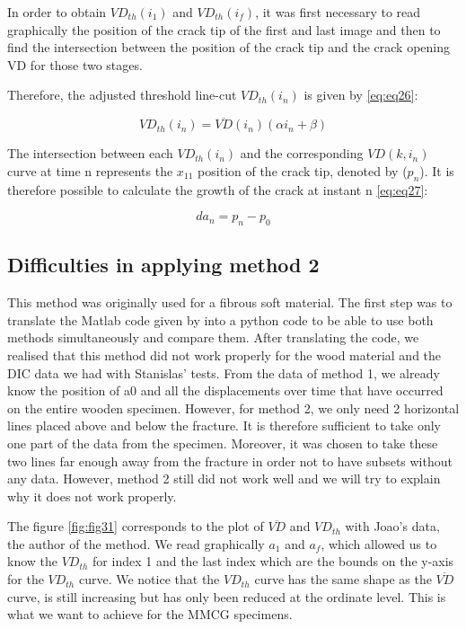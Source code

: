 In order to obtain $VD_{th}(i_1)$ and $VD_{th}(i_f)$, it was first necessary to read graphically the position of the crack tip of the first and last image and then to find the intersection between the position of the crack tip and the crack opening VD for those two stages.

Therefore, the adjusted threshold line-cut $VD_{th}(i_n)$ is given by \ref{eq:eq26}:

\begin{equation}
	VD_{th}(i_n)=\overline{VD}(i_n)(\alpha i_n +\beta)
	\label{eq:eq26}
\end{equation}

The intersection between each $VD_{th}(i_n)$ and the corresponding $VD(k, i_n)$ curve at time n represents the $x_{11}$ position of the crack tip, denoted by ($p_n$).
It is therefore possible to calculate the growth of the crack at instant n \ref{eq:eq27}:

\begin{equation}
	da_n=p_n-p_0
	\label{eq:eq27}
\end{equation}

\subsection{Difficulties in applying method 2}

This method was originally used for a fibrous soft material. The first step was to translate the Matlab code given by \cite{FilhoJ2022} into a python code to be able to use both methods simultaneously and compare them.
After translating the code, we realised that this method did not work properly for the wood material and the DIC data we had with Stanislas' tests.
From the data of method 1, we already know the position of a0 and all the displacements over time that have occurred on the entire wooden specimen. However, for method 2, we only need 2 horizontal lines placed above and below the fracture. It is therefore sufficient to take only one part of the data from the specimen. Moreover, it was chosen to take these two lines far enough away from the fracture in order not to have subsets without any data.
However, method 2 still did not work well and we will try to explain why it does not work properly.

The figure \ref{fig:fig31} corresponds to the plot of $\overline{VD}$ and $VD_{th}$ with Joao's data, the author of the method. We read graphically $a_1$ and $a_f$, which allowed us to know the $VD_{th}$ for index 1 and the last index which are the bounds on the y-axis for the $VD_{th}$ curve. We notice that the $VD_{th}$ curve has the same shape as the $\overline{VD}$ curve, is still increasing but has only been reduced at the ordinate level. This is what we want to achieve for the MMCG specimens.

